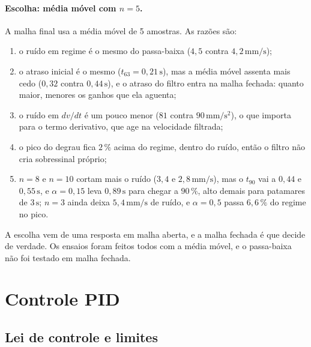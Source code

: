 \documentclass[11pt,a4paper]{article}
\newcommand{\unid}[1]{\,\mathrm{#1}}
\begin{document}
\paragraph{Escolha: média móvel com $n = 5$.} A malha final usa a média móvel de 5 amostras. As razões são:
\begin{enumerate}[nosep]
  \item o ruído em regime é o mesmo do passa-baixa ($4{,}5$ contra $4{,}2\unid{mm/s}$);
  \item o atraso inicial é o mesmo ($t_{63} = 0{,}21\unid{s}$), mas a média móvel assenta mais cedo ($0{,}32$ contra $0{,}44\unid{s}$), e o atraso do filtro entra na malha fechada: quanto maior, menores os ganhos que ela aguenta;
  \item o ruído em $dv/dt$ é um pouco menor ($81$ contra $90\unid{mm/s^2}$), o que importa para o termo derivativo, que age na velocidade filtrada;
  \item o pico do degrau fica $2\,\%$ acima do regime, dentro do ruído, então o filtro não cria sobressinal próprio;
  \item $n = 8$ e $n = 10$ cortam mais o ruído ($3{,}4$ e $2{,}8\unid{mm/s}$), mas o $t_{90}$ vai a $0{,}44$ e $0{,}55\unid{s}$, e $\alpha = 0{,}15$ leva $0{,}89\unid{s}$ para chegar a $90\,\%$, alto demais para patamares de $3\unid{s}$; $n = 3$ ainda deixa $5{,}4\unid{mm/s}$ de ruído, e $\alpha = 0{,}5$ passa $6{,}6\,\%$ do regime no pico.
\end{enumerate}
A escolha vem de uma resposta em malha aberta, e a malha fechada é que decide de verdade. Os ensaios foram feitos todos com a média móvel, e o passa-baixa não foi testado em malha fechada.

\section{Controle PID}

\subsection{Lei de controle e limites}
\end{document}
